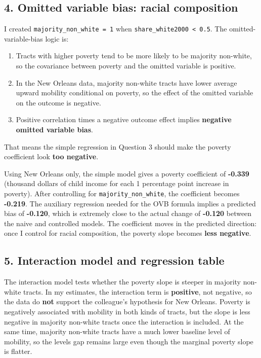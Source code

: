 \documentclass[
]{article}
\providecommand{\tightlist}{%
  \setlength{\itemsep}{0pt}\setlength{\parskip}{0pt}}
\begin{document}
\subsection{4. Omitted variable bias: racial
composition}\label{omitted-variable-bias-racial-composition}

I created \texttt{majority\_non\_white\ =\ 1} when
\texttt{share\_white2000\ \textless{}\ 0.5}. The omitted-variable-bias
logic is:

\begin{enumerate}
\def\labelenumi{\arabic{enumi}.}
\tightlist
\item
  Tracts with higher poverty tend to be more likely to be majority
  non-white, so the covariance between poverty and the omitted variable
  is positive.
\item
  In the New Orleans data, majority non-white tracts have lower average
  upward mobility conditional on poverty, so the effect of the omitted
  variable on the outcome is negative.
\item
  Positive correlation times a negative outcome effect implies
  \textbf{negative omitted variable bias}.
\end{enumerate}

That means the simple regression in Question 3 should make the poverty
coefficient look \textbf{too negative}.

Using New Orleans only, the simple model gives a poverty coefficient of
\textbf{-0.339} (thousand dollars of child income for each 1 percentage
point increase in poverty). After controlling for
\texttt{majority\_non\_white}, the coefficient becomes \textbf{-0.219}.
The auxiliary regression needed for the OVB formula implies a predicted
bias of \textbf{-0.120}, which is extremely close to the actual change
of \textbf{-0.120} between the naive and controlled models. The
coefficient moves in the predicted direction: once I control for racial
composition, the poverty slope becomes \textbf{less negative}.

\subsection{5. Interaction model and regression
table}\label{interaction-model-and-regression-table}

The interaction model tests whether the poverty slope is steeper in
majority non-white tracts. In my estimates, the interaction term is
\textbf{positive}, not negative, so the data do \textbf{not} support the
colleague's hypothesis for New Orleans. Poverty is negatively associated
with mobility in both kinds of tracts, but the slope is less negative in
majority non-white tracts once the interaction is included. At the same
time, majority non-white tracts have a much lower baseline level of
mobility, so the levels gap remains large even though the marginal
poverty slope is flatter.
\end{document}
